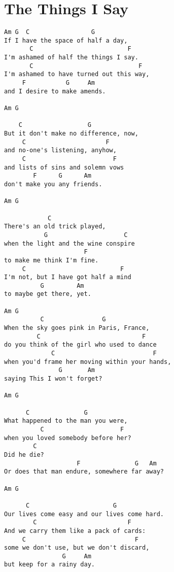 \documentclass[leqno]{memoir}
\begin{document}
\chapter{The Things I Say}
\begin{verbatim}
Am G  C                 G
If I have the space of half a day, 
       C                          F
I'm ashamed of half the things I say. 
       C                             F
I'm ashamed to have turned out this way, 
     F           G     Am
and I desire to make amends.

Am G

    C                  G
But it don't make no difference, now,
     C                      F
and no-one's listening, anyhow,
     C                        F
and lists of sins and solemn vows
        F      G      Am
don't make you any friends.

Am G

            C
There's an old trick played,
           G                     C
when the light and the wine conspire
                      F
to make me think I'm fine.
     C                          F
I'm not, but I have got half a mind
          G         Am
to maybe get there, yet.

Am G
          C                G
When the sky goes pink in Paris, France,
         C                            F
do you think of the girl who used to dance
             C                           F
when you'd frame her moving within your hands,
               G       Am
saying This I won't forget?

Am G

      C               G
What happened to the man you were,
          C                     F
when you loved somebody before her?
        C  
Did he die?
                    F               G   Am
Or does that man endure, somewhere far away?

Am G

      C                       G
Our lives come easy and our lives come hard.
        C                         F
And we carry them like a pack of cards:
     C                              F
some we don't use, but we don't discard,
                G     Am
but keep for a rainy day.
\end{verbatim}
\newpage
\end{document}
